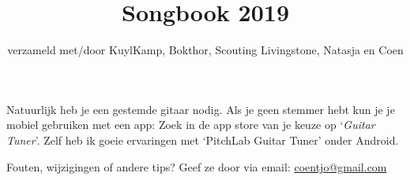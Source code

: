 \documentclass[a4,openany,portrait,tikz]{article}
\title{Songbook 2019}
\author{verzameld met/door KuylKamp, Bokthor, Scouting Livingstone, Natasja en Coen}
\begin{document}

  \maketitle









Natuurlijk heb je een gestemde gitaar nodig. Als je geen stemmer hebt kun je je mobiel gebruiken met een app: Zoek in de app store van je keuze op `\emph{Guitar Tuner}'. Zelf heb ik goeie ervaringen met `PitchLab Guitar Tuner' onder Android.


Fouten, wijzigingen of andere tips? Geef ze door via email:   \href{mailto:coentjo@gmail.com}{coentjo@gmail.com}





%
\end{document}

